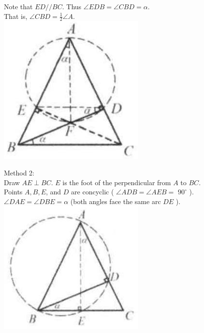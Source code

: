 \documentclass[10pt]{article}
\begin{document}
Note that \(E D / / B C\). Thus \(\angle E D B=\angle C B D=\alpha\).\\
That is, \(\angle C B D=\frac{1}{2} \angle A\).\\
\includegraphics[max width=\textwidth, center]{2025_04_17_97bc1f7e44d93c271a88g-194}

Method 2:\\
Draw \(A E \perp B C\). \(E\) is the foot of the perpendicular from \(A\) to \(B C\).\\
Points \(A, B, E\), and \(D\) are concyclic ( \(\angle A D B=\angle A E B=\) \(90^{\circ}\) ).\\
\(\angle D A E=\angle D B E=\alpha\) (both angles face the same arc \(D E\) ).\\
\includegraphics[max width=\textwidth, center]{2025_04_17_97bc1f7e44d93c271a88g-194(1)}
\end{document}

